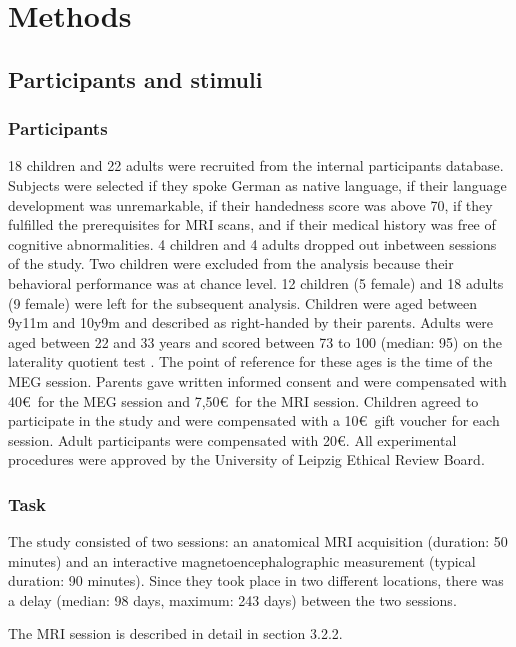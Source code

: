 \chapter{Methods}\label{methods}

\section {Participants and stimuli}

\subsection{Participants}

18 children and 22 adults were recruited from the internal participants database.
Subjects were selected if they spoke German as native language, if their language development was unremarkable, if their handedness score was above 70, if they fulfilled the prerequisites for MRI scans, and if their medical history was free of cognitive abnormalities.
4 children and 4 adults dropped out inbetween sessions of the study.
Two children were excluded from the analysis because their behavioral performance was at chance level.
12 children (5 female) and 18 adults (9 female) were left for the subsequent analysis.
Children were aged between 9y11m and 10y9m and described as right-handed by their parents.
Adults were aged between 22 and 33 years and scored between 73 to 100 (median: 95) on the laterality quotient test \cite{3.1.LQ}.
The point of reference for these ages is the time of the MEG session.
Parents gave written informed consent and were compensated with 40\euro \ for the MEG session and 7,50\euro \ for the MRI session.
Children agreed to participate in the study and were compensated with a 10\euro \ gift voucher for each session.
Adult participants were compensated with 20\euro.
All experimental procedures were approved by the University of Leipzig Ethical Review Board.


\subsection{Task}

The study consisted of two sessions: an anatomical MRI acquisition (duration: 50 minutes) and an interactive magnetoencephalographic measurement (typical duration: 90 minutes).
Since they took place in two different locations, there was a delay (median: 98 days, maximum: 243 days) between the two sessions.

The MRI session is described in detail in section 3.2.2.

